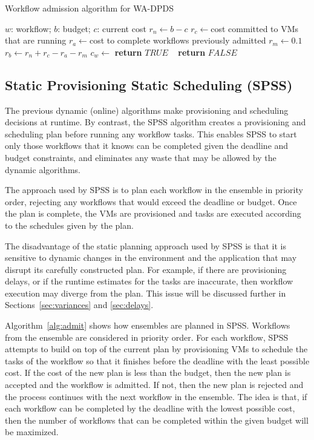 \documentclass[preprint,5p]{elsarticle}
\begin{document}
\begin{algorithm}[tb]
\caption{Workflow admission algorithm for WA-DPDS}
\label{alg:wa-dpds}
{\footnotesize
\begin{algorithmic}[1]
\Require $w$: workflow; $b$: budget; $c$: current cost
    \State $r_n\gets b-c$ 
    \State $r_c\gets $cost committed to VMs that are running
    \State $r_a\gets $cost to complete workflows previously admitted
  \State $r_m\gets 0.1$ 
  \State $r_b\gets r_n+r_c-r_a-r_m$ 
  \State $c_w\gets$ 
      \textbf{return} $TRUE$
    \Else ~  \textbf{return} $FALSE$
  \EndIf       
\EndProcedure
\end{algorithmic}
}
\end{algorithm}


\subsection{Static Provisioning Static Scheduling (SPSS)}

The previous dynamic (online) algorithms make provisioning and scheduling
decisions at runtime. By contrast, the SPSS algorithm creates a provisioning
and scheduling plan before running any workflow tasks. This enables SPSS to
start only those workflows that it knows can be completed given the deadline and
budget constraints, and eliminates any waste that may be allowed by the dynamic
algorithms.

The approach used by SPSS is to plan each workflow in the ensemble in priority
order, rejecting any workflows that would exceed the deadline or budget. Once the
plan is complete, the VMs are provisioned and tasks are executed according to
the schedules given by the plan.

The disadvantage of the static planning approach used by SPSS is that it is
sensitive to dynamic changes in the environment and the application that may
disrupt its carefully constructed plan. For example, if there are provisioning
delays, or if the runtime estimates for the tasks are inaccurate, then workflow
execution may diverge from the plan. This issue will be discussed further in
Sections~\ref{sec:variances} and \ref{sec:delays}.

Algorithm~\ref{alg:admit} shows how ensembles are planned in SPSS. Workflows
from the ensemble are considered in priority order. For each workflow, SPSS
attempts to build on top of the current plan by provisioning VMs to schedule the
tasks of the workflow so that it finishes before the deadline with the least
possible cost. If the cost of the new plan is less than the budget, then the new
plan is accepted and the workflow is admitted. If not, then the new plan is
rejected and the process continues with the next workflow in the ensemble. The
idea is that, if each workflow can be completed by the
deadline with the lowest possible cost, then the number of workflows that can be
completed within the given budget will be maximized.
\end{document}
